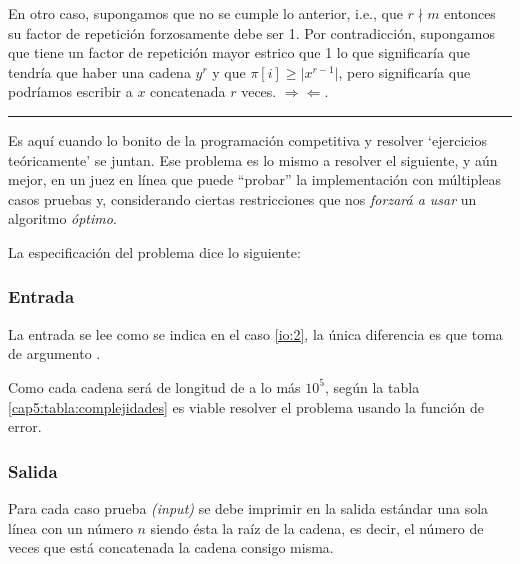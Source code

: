 En otro caso, supongamos que no se cumple lo anterior, i.e., que $r \nmid m$ entonces su factor de
repetición forzosamente debe ser 1. Por contradicción, supongamos que tiene un factor de repetición
mayor estrico que 1 lo que significaría que tendría que haber una cadena $y^r$ 
y que $\pi[i] \geq \vert x^{r-1} \vert$, pero significaría que podríamos 
escribir a $x$ concatenada $r$
veces. $\Rightarrow\!\Leftarrow$.
\noindent\rule{\textwidth}{1pt}

Es aquí cuando lo bonito de la programación competitiva y resolver `ejercicios teóricamente' se
juntan. Ese problema es lo mismo a resolver el siguiente, y aún mejor, en un 
juez en línea que puede ``probar'' la implementación con múltipleas casos 
pruebas y, considerando ciertas restricciones que nos \textit{forzará a usar} 
un algoritmo \textit{óptimo}.

La especificación del problema dice lo siguiente:



\subsubsection{Entrada}
La entrada se lee como se indica en el caso \ref{io:2}, la única diferencia es que
 toma de argumento .

Como cada cadena será de longitud de a lo más $10^5$, según la tabla
\ref{cap5:tabla:complejidades} es viable resolver el problema usando la función 
de error. 

\subsubsection{Salida}
Para cada caso prueba \textit{(input)} se debe imprimir en la salida estándar una sola línea con un
número $n$ siendo ésta la raíz de la cadena, es decir, el número de veces que está concatenada la
cadena consigo misma.

